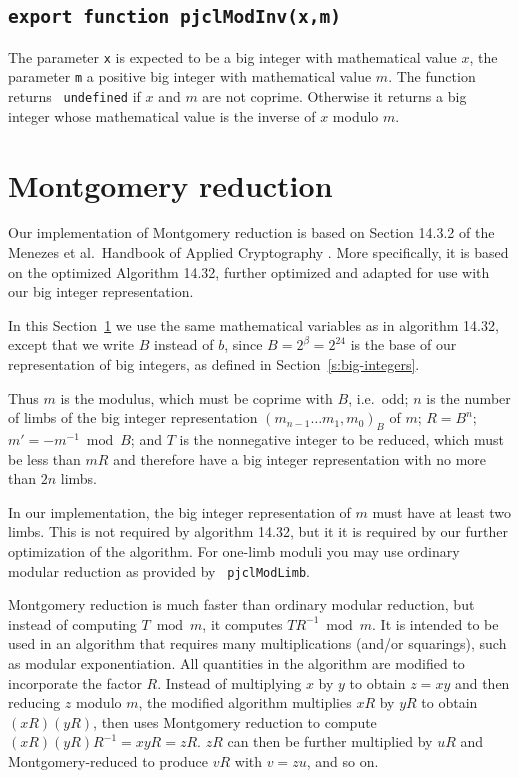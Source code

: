 \documentclass[12pt]{article}
\begin{document}
\subsection{\tt export function pjclModInv(x,m)}

The parameter {\tt x} is expected to be a big integer with
mathematical value $x$, the parameter {\tt m} a positive big integer
with mathematical value $m$.  The function returns {\tt
  undefined} if $x$ and $m$ are not coprime.  Otherwise it returns a
big integer whose mathematical value is the inverse of $x$ modulo $m$.

\section{Montgomery reduction}
\label{s:montred}

Our implementation of Montgomery reduction is based on Section 14.3.2
of the Menezes et al.\ Handbook of Applied Cryptography
\cite{Menezes97handbookof}.  More specifically, it is based on the
optimized Algorithm 14.32, further optimized and adapted for use with
our big integer representation.

In this Section~\ref{s:montred} we use the same mathematical variables
as in algorithm 14.32, except that we write $B$ instead of $b$, since $B = 2^\beta = 2^{24}$ is
the base of our representation of big integers, as defined in Section~\ref{s:big-integers}.  

Thus $m$ is the modulus, which must be coprime with $B$, i.e.\ odd;
$n$ is the number of limbs of the big integer representation 
$(m_{n-1} \ldots m_1,m_0)_B$ of $m$;
$R=B^n$;
$m' = -m^{-1} \bmod B$; and $T$ is the nonnegative integer to be reduced, which must be
less than $mR$ and therefore have a big integer representation with no
more than $2n$ limbs.

In our implementation, the big integer representation of $m$ must have
at least two limbs.  This is not required by algorithm 14.32, but it
it is required by our further optimization of the algorithm.  For one-limb
moduli you may use ordinary modular reduction as provided by {\tt
  pjclModLimb}.

Montgomery reduction is much faster than ordinary modular reduction,
but instead of computing $T \bmod m$, it computes $TR^{-1} \bmod m$.
It is intended to be used in an algorithm that requires many
multiplications (and/or squarings), such as modular exponentiation.
All quantities in the algorithm are modified to incorporate the factor
$R$.  Instead of multiplying $x$ by $y$ to obtain $z = xy$ and then
reducing $z$ modulo $m$, the modified algorithm multiplies $xR$ by
$yR$ to obtain $(xR)(yR)$, then uses Montgomery reduction to compute
$(xR)(yR)R^{-1} = xyR = zR$.  $zR$ can then be further multiplied by
$uR$ and Montgomery-reduced to produce $vR$ with $v=zu$, and so on.
\end{document}
